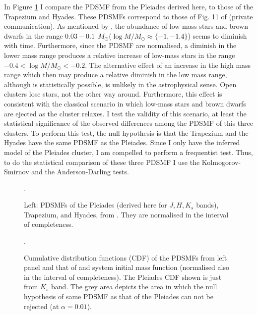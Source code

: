 In Figure \ref{fig:PDSMFcomparison} I compare the PDSMF from the Pleiades derived here, to those of the Trapezium and Hyades. These PDSMFs correspond to those of  Fig. 11 of \citet{Bouy2015} (private communication). As mentioned by \citet{Bouy2015}, the abundance of low-mass stars and brown dwarfs in the range $0.03 - 0.1 \ \ M_{\odot}$($\log M/M_{\odot} \approx \{-1, -1.4\}$) seems to diminish with time. Furthermore, since the PDSMF are normalised, a diminish in the lower mass range produces a relative increase of low-mass stars in the range $-0.4 < \log M/M_{\odot} < -0.2$. The alternative effect of an increase in the high mass range which then may produce a relative diminish in the low mass range, although is statistically possible, is unlikely in the astrophysical sense. Open clusters lose stars, not the other way around. Furthermore, this effect is consistent with the classical scenario in which low-mass stars and brown dwarfs are ejected as the cluster relaxes. I test the validity of this scenario, at least the statistical significance of the observed differences among the PDSMF of this three clusters. To perform this test, the null hypothesis is that the Trapezium and the Hyades have the same PDSMF as the Pleiades. Since I only have the inferred model of the Pleiades cluster, I am compelled to perform a frequentist test. Thus, to do the statistical comparison of these three PDSMF I use the Kolmogorov-Smirnov and the Anderson-Darling tests. 

\begin{figure}[htp]
\begin{center}
\caption{Left: PDSMFs of the Pleiades (derived here for $J,H,K_s$ bands), Trapezium, and Hyades, from \citet{Bouy2015}. They are normalised in the interval of completeness.}
\label{fig:PDSMFcomparison}.
\end{center}
\end{figure}

\begin{figure}[htp]
\begin{center}
\caption{Cumulative distribution functions (CDF) of the PDSMFs from left panel and that of \citet{Chabrier2005} and \citet{Thies2007} system initial mass function (normalised also in the interval of completeness). The Pleiades CDF shown is just from $K_s$ band. The grey area depicts the area in which the null hypothesis of same PDSMF as that of the Pleiades can not be rejected (at $\alpha=0.01$).}
\label{fig:PDSMFtest}.
\end{center}
\end{figure}


